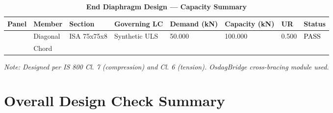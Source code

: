 \documentclass[12pt,a4paper]{report}
\numberwithin{table}{chapter}
\numberwithin{figure}{chapter}
\begin{document}
\vspace{1em}

\begin{longtable}{|C{2.0cm}|L{1.8cm}|C{2.2cm}|C{3.0cm}|C{1.8cm}|C{1.8cm}|C{1.2cm}|C{1.8cm}|}
\caption{\textbf{End Diaphragm Design --- Capacity Summary}}
\hline
\textbf{Panel} & \textbf{Member} & \textbf{Section} & \textbf{Governing LC} & \textbf{Demand (kN)} & \textbf{Capacity (kN)} & \textbf{UR} & \textbf{Status} \\[6pt]
\hline
{} & Diagonal & ISA 75x75x8 & Synthetic ULS & 50.000 & 100.000 & 0.500 & \textcolor{black}{PASS} \\[6pt]
 & Chord &  &  &  &  &  &  \\[6pt]
\hline
\end{longtable}
\noindent\textit{Note: Designed per IS 800 Cl. 7 (compression) and Cl. 6 (tension). OsdagBridge cross-bracing module used.}

\section{Overall Design Check Summary}
\label{sec:overall-summary}
\end{document}
